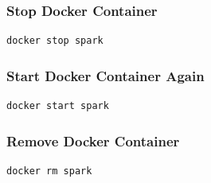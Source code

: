 \subsubsection{Stop Docker Container}

\begin{lstlisting}
docker stop spark
\end{lstlisting}

\subsubsection{Start Docker Container Again}

\begin{lstlisting}
docker start spark
\end{lstlisting}

\subsubsection{Remove Docker Container}

\begin{lstlisting}
docker rm spark
\end{lstlisting}